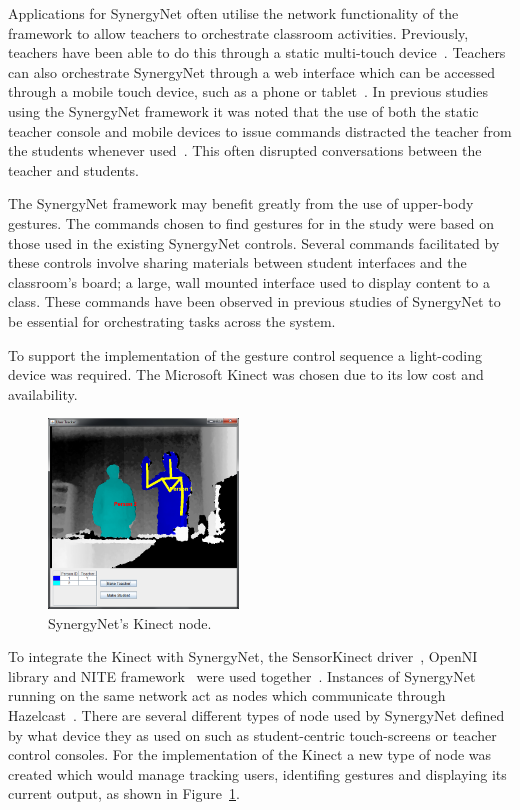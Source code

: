 \documentclass[link]{IWCOMP}
\begin{document}
Applications for SynergyNet often utilise the network functionality of the framework to allow teachers to orchestrate classroom activities.
Previously, teachers have been able to do this through a static multi-touch device~\cite{AlAgha2010}.
Teachers can also orchestrate SynergyNet through a web interface which can be accessed through a mobile touch device, such as a phone or tablet~\cite{Mercier2013}.
In previous studies using the SynergyNet framework it was noted that the use of both the static teacher console and mobile devices to issue commands distracted the teacher from the students whenever used~\cite{Hatch2011,Mercier2013}.
This often disrupted conversations between the teacher and students.

The SynergyNet framework may benefit greatly from the use of upper-body gestures. 
The commands chosen to find gestures for in the study were based on those used in the existing SynergyNet controls. 
Several commands facilitated by these controls involve sharing materials between student interfaces and the classroom's board; a large, wall mounted interface used to display content to a class.
These commands have been observed in previous studies of SynergyNet to be essential for orchestrating tasks across the system.

To support the implementation of the gesture control sequence a light-coding device was required.
The Microsoft Kinect was chosen due to its low cost and availability.

\begin{figure}[h]
   \centering
   \includegraphics[width=0.45\textwidth]{figures/kinect_node.png}
   \caption{SynergyNet's Kinect node.}
   \label{fig:kinectNode}
\end{figure}

To integrate the Kinect with SynergyNet, the SensorKinect driver~\cite{Avin2011}, OpenNI library and NITE framework~\cite{Organisation2011} were used together~\cite{Davison2012}.
Instances of SynergyNet running on the same network act as nodes which communicate through Hazelcast~\cite{Hazelcast2009}.
There are several different types of node used by SynergyNet defined by what device they as used on such as student-centric touch-screens or teacher control consoles.
For the implementation of the Kinect a new type of node was created which would manage tracking users, identifing gestures and displaying its current output, as shown in Figure~\ref{fig:kinectNode}.
\end{document}
